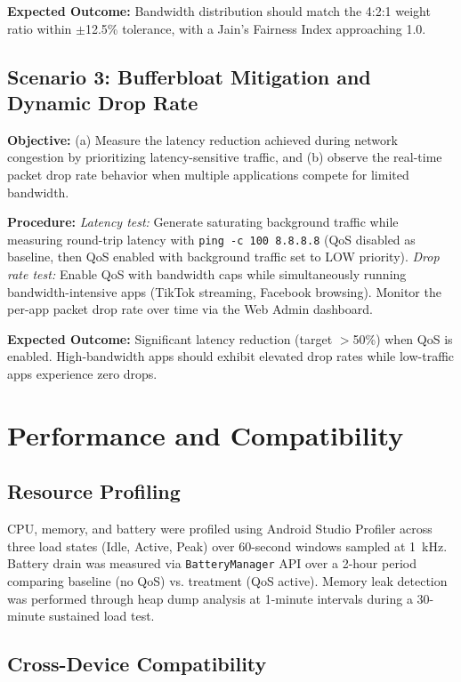 \textbf{Expected Outcome:} Bandwidth distribution should match the 4:2:1 weight ratio within $\pm$12.5\% tolerance, with a Jain's Fairness Index approaching 1.0.

\subsection{Scenario 3: Bufferbloat Mitigation and Dynamic Drop Rate}

\textbf{Objective:} (a) Measure the latency reduction achieved during network congestion by prioritizing latency-sensitive traffic, and (b) observe the real-time packet drop rate behavior when multiple applications compete for limited bandwidth.

\textbf{Procedure:} \textit{Latency test:} Generate saturating background traffic while measuring round-trip latency with \texttt{ping -c 100 8.8.8.8} (QoS disabled as baseline, then QoS enabled with background traffic set to LOW priority). \textit{Drop rate test:} Enable QoS with bandwidth caps while simultaneously running bandwidth-intensive apps (TikTok streaming, Facebook browsing). Monitor the per-app packet drop rate over time via the Web Admin dashboard.

\textbf{Expected Outcome:} Significant latency reduction (target $>$50\%) when QoS is enabled. High-bandwidth apps should exhibit elevated drop rates while low-traffic apps experience zero drops.

\section{Performance and Compatibility}
\label{sec:profiling}

\subsection{Resource Profiling}

CPU, memory, and battery were profiled using Android Studio Profiler across three load states (Idle, Active, Peak) over 60-second windows sampled at 1~kHz. Battery drain was measured via \texttt{BatteryManager} API over a 2-hour period comparing baseline (no QoS) vs. treatment (QoS active). Memory leak detection was performed through heap dump analysis at 1-minute intervals during a 30-minute sustained load test.

\subsection{Cross-Device Compatibility}

